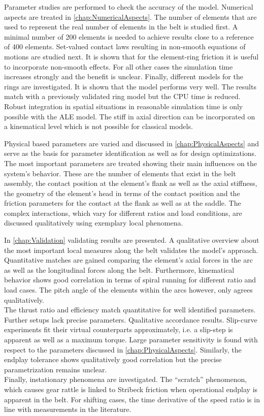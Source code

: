Parameter studies are performed to check the accuracy of the model. 
Numerical aspects are treated in \cref{chap:NumericalAspects}. 
The number of elements that are used to represent the real number of elements in the belt is studied first. 
A minimal number of 200 elements is needed to achieve results close to a reference of 400 elements. 
Set-valued contact laws resulting in non-smooth equations of motions are studied next. 
It is shown that for the element-ring friction it is useful to incorporate non-smooth effects. 
For all other cases the simulation time increases strongly and the benefit is unclear. 
Finally, different models for the rings are investigated. 
It is shown that the \ALE model performs very well.
The results match with a previously validated ring model but the CPU time is reduced. 
Robust integration in spatial situations in reasonable simulation time is only possible with the ALE model.
The stiff \DOFs in axial direction can be incorporated on a kinematical level which is not possible for classical models.\par

Physical based parameters are varied and discussed in \cref{chap:PhysicalAspects} and serve as the basis for parameter identification as well as for design optimizations.
The most important parameters are treated showing their main influences on the system's behavior. 
These are the number of elements that exist in the belt assembly, the contact position at the element's flank as well as the axial stiffness, the geometry of the element's head in terms of the contact position and the friction parameters for the contact at the flank as well as at the saddle. 
The complex interactions, which vary for different ratios and load conditions, are discussed qualitatively using exemplary local phenomena.\par

In \cref{chap:Validation} validating results are presented. 
A qualitative overview about the most important local measures along the belt validates the model's approach. 
Quantitative matches are gained comparing the element's axial forces in the arc as well as the longitudinal forces along the belt. 
Furthermore, kinematical behavior shows good correlation in terms of spiral running for different ratio and load cases. 
The pitch angle of the elements within the arcs however, only agrees qualitatively.\\
The thrust ratio and efficiency match quantitative for well identified parameters. 
Further setups lack  precise parameters. 
Qualitative accordance results. 
Slip-curve experiments fit their virtual counterparts approximately, i.e. a slip-step is apparent as well as a maximum torque. 
Large parameter sensitivity is found with respect to the parameters discussed in \cref{chap:PhysicalAspects}.
Similarly, the endplay tolerance shows qualitatively  good correlation but the precise parametrization remains unclear.\\
Finally, instationary phenomena are investigated. 
The ``scratch'' phenomenon, which causes gear rattle is linked to Stribeck friction when operational endplay is apparent in the belt. 
For shifting cases, the time derivative of the speed ratio is in line with measurements in the literature.

